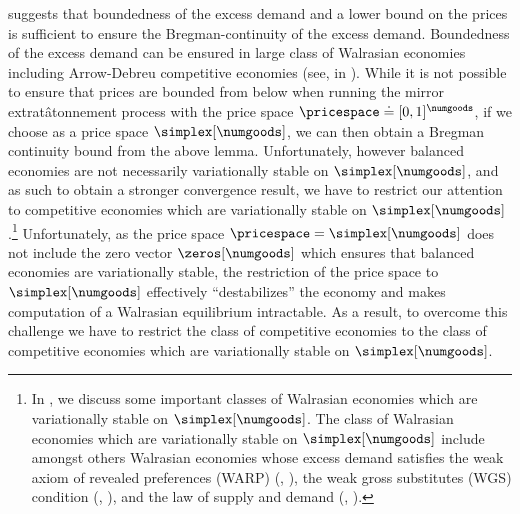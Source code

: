  suggests that boundedness of the excess demand and a lower bound on the prices is sufficient to ensure the Bregman-continuity of the excess demand. Boundedness of the excess demand can be ensured in large class of Walrasian economies including Arrow-Debreu competitive economies (see,  in ). While it is not possible to ensure that prices are bounded from below when running the mirror extrat\^atonnement process with the price space $\pricespace \doteq [0, 1]^\numgoods$, if we choose as a price space $\simplex[\numgoods]$, we can then obtain a Bregman continuity bound from the above lemma. Unfortunately, however balanced economies are not necessarily variationally stable on $\simplex[\numgoods]$, and as such to obtain a stronger convergence result, we have to restrict our attention to competitive economies which are variationally stable on $\simplex[\numgoods]$.\footnote{
In , we discuss some important classes of Walrasian economies which are variationally stable on $\simplex[\numgoods]$. The class of Walrasian economies which are variationally stable on $\simplex[\numgoods]$ include amongst others Walrasian economies whose excess demand satisfies the weak axiom of revealed preferences (WARP) (, ), the weak gross substitutes (WGS) condition (, ), and the law of supply and demand (, ).}
% 
% 
Unfortunately, as the price space $\pricespace = \simplex[\numgoods]$ does not include the zero vector $\zeros[\numgoods]$ which ensures that balanced economies are variationally stable,  the restriction of the price space to $\simplex[\numgoods]$ effectively ``destabilizes'' the economy and makes computation of a Walrasian equilibrium intractable. As a result, to overcome this challenge we have to restrict the class of competitive economies to the class of competitive economies which are variationally stable on $\simplex[\numgoods]$.
